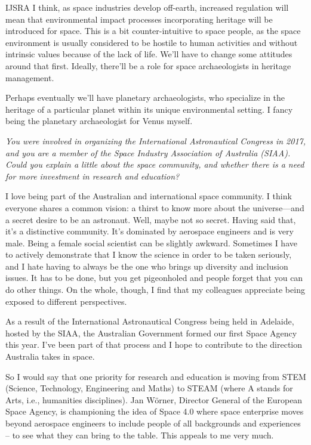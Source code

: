 \begin{labeling}{IJSRA}
	I think, as space industries develop off-earth, increased regulation will mean that environmental impact processes incorporating heritage will be introduced for space. This is a bit counter-intuitive to space people, as the space environment is usually considered to be hostile to human activities and without intrinsic values because of the lack of life. We’ll have to change some attitudes around that first. Ideally, there’ll be a role for space archaeologists in heritage management.

	Perhaps eventually we’ll have planetary archaeologists, who specialize in the heritage of a particular planet within its unique environmental setting. I fancy being the planetary archaeologist for Venus myself.

	\item[IJSRA] \emph{You were involved in organizing the International Astronautical Congress in 2017, and you are a member of the Space Industry Association of Australia (SIAA). Could you explain a little about the space community, and whether there is a need for more investment in research and education?}

	\item[AG] I love being part of the Australian and international space community. I think everyone shares a common vision: a thirst to know more about the universe—and a secret desire to be an astronaut. Well, maybe not so secret. Having said that, it’s a distinctive community. It’s dominated by aerospace engineers and is very male. Being a female social scientist can be slightly awkward. Sometimes I have to actively demonstrate that I know the science in order to be taken seriously, and I hate having to always be the one who brings up diversity and inclusion issues. It has to be done, but you get pigeonholed and people forget that you can do other things. On the whole, though, I find that my colleagues appreciate being exposed to different perspectives.

	As a result of the International Astronautical Congress being held in Adelaide, hosted by the SIAA, the Australian Government formed our first Space Agency this year. I’ve been part of that process and I hope to contribute to the direction Australia takes in space.

	So I would say that one priority for research and education is moving from STEM (Science, Technology, Engineering and Maths) to STEAM (where A stands for Arts, i.e., humanities disciplines). Jan Wörner, Director General of the European Space Agency, is championing the idea of Space 4.0 where space enterprise moves beyond aerospace engineers to include people of all backgrounds and experiences – to see what they can bring to the table. This appeals to me very much.


\end{labeling}
